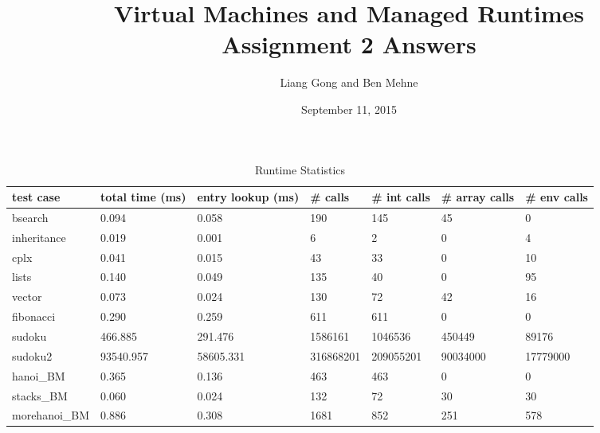 \documentclass[notitlepage]{report}
\title{\vspace{-0.5in}Virtual Machines and Managed Runtimes \\ Assignment 2 Answers}
\date{\vspace{-0.5in}September 11, 2015}
\author{\vspace{-0.5in}Liang Gong and Ben Mehne\vspace{-0.5in}}
\begin{document}
\maketitle


\begin{table}[]
\centering
\caption{Runtime Statistics}
\label{statistics}
\begin{tabular}{lllllll}
\toprule
test case & total time (ms)    & entry lookup (ms) & \# calls & \# int calls & \# array calls & \# env calls \\
\midrule
bsearch       & 0.094                 & 0.058        & 190              & 145                & 45               & 0        \\
inheritance   & 0.019                 & 0.001        & 6                & 2                  & 0                & 4        \\
cplx          & 0.041                 & 0.015        & 43               & 33                 & 0                & 10       \\
lists         & 0.140                 & 0.049        & 135              & 40                 & 0                & 95       \\
vector        & 0.073                 & 0.024        & 130              & 72                 & 42               & 16       \\
fibonacci     & 0.290                 & 0.259        & 611              & 611                & 0                & 0        \\
sudoku        & 466.885               & 291.476      & 1586161          & 1046536            & 450449           & 89176    \\
sudoku2       & 93540.957             & 58605.331    & 316868201        & 209055201          & 90034000         & 17779000 \\
hanoi\_BM     & 0.365                 & 0.136        & 463              & 463                & 0                & 0        \\
stacks\_BM    & 0.060                 & 0.024        & 132              & 72                 & 30               & 30       \\
morehanoi\_BM & 0.886                 & 0.308        & 1681             & 852                & 251              & 578      \\
\bottomrule
\end{tabular}
\end{table}
\end{document}
